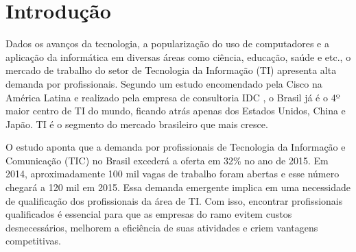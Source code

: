 

\begin{center}

\end{center}
\chapter{Introdução}

\label{chap:introduction}

Dados os avanços da tecnologia, a popularização do uso de computadores e a aplicação da informática em diversas áreas como ciência, educação, saúde e etc., o mercado de trabalho do setor de Tecnologia da Informação (TI) apresenta alta demanda por profissionais. Segundo um estudo encomendado pela Cisco na América Latina e realizado pela empresa de consultoria IDC \cite{cisco:13}, o Brasil já é o 4º maior centro de TI do mundo, ficando atrás apenas dos Estados Unidos, China e Japão. TI é o segmento do mercado brasileiro que mais cresce. 


O estudo aponta que a demanda por profissionais de Tecnologia da Informação e Comunicação (TIC) no Brasil excederá a oferta em 32\% no ano de 2015. Em 2014, aproximadamente 100 mil vagas de trabalho foram abertas e esse número chegará a 120 mil em 2015. Essa demanda emergente implica em uma necessidade de qualificação dos profissionais da área de TI. Com isso, encontrar profissionais qualificados é essencial para que as empresas do ramo evitem custos desnecessários, melhorem a eficiência de suas atividades e criem vantagens competitivas.

 

